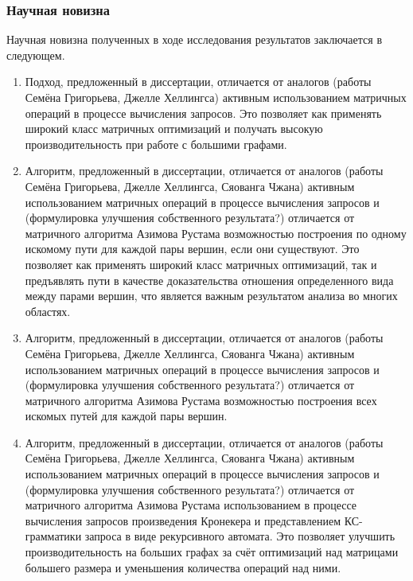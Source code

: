 \subsubsection*{\large{Научная новизна}}

Научная новизна полученных в ходе исследования результатов заключается в следующем.

\begin{enumerate}

\item Подход, предложенный в диссертации, отличается от аналогов (работы Семёна Григорьева, Джелле Хеллингса) активным использованием матричных операций в процессе вычисления запросов. Это позволяет как применять широкий класс матричных оптимизаций и получать высокую производительность при работе с большими графами.

\item Алгоритм, предложенный в диссертации, отличается от аналогов (работы Семёна Григорьева, Джелле Хеллингса, Сяованга Чжана) активным использованием матричных операций в процессе вычисления запросов и (формулировка улучшения собственного результата?) отличается от матричного алгоритма Азимова Рустама возможностью построения по одному искомому пути для каждой пары вершин, если они существуют. Это позволяет как применять широкий класс матричных оптимизаций, так и предъявлять пути в качестве доказательства отношения определенного вида между парами вершин, что является важным результатом анализа во многих областях.

\item Алгоритм, предложенный в диссертации, отличается от аналогов (работы Семёна Григорьева, Джелле Хеллингса, Сяованга Чжана) активным использованием матричных операций в процессе вычисления запросов и (формулировка улучшения собственного результата?) отличается от матричного алгоритма Азимова Рустама возможностью построения всех искомых путей для каждой пары вершин.

\item Алгоритм, предложенный в диссертации, отличается от аналогов (работы Семёна Григорьева, Джелле Хеллингса, Сяованга Чжана) активным использованием матричных операций в процессе вычисления запросов и (формулировка улучшения собственного результата?) отличается от матричного алгоритма Азимова Рустама использованием в процессе вычисления запросов произведения Кронекера и представлением КС-грамматики запроса в виде рекурсивного автомата. Это позволяет улучшить производительность на больших графах за счёт оптимизаций над матрицами большего размера и уменьшения количества операций над ними.

\end{enumerate}

